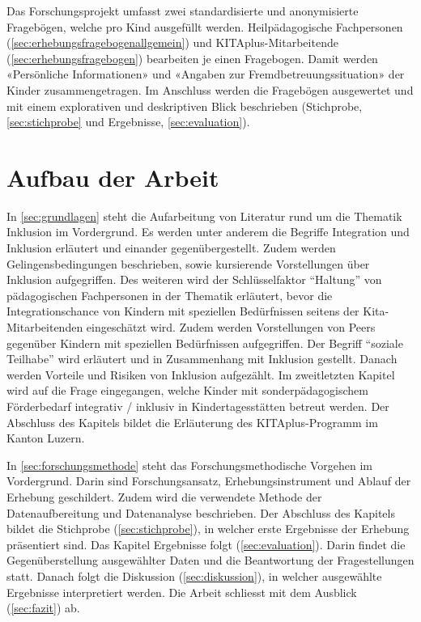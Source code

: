 \documentclass[
  ngerman,
  11pt,
  paper=a4,
  twoside,
  titlepage=true,
  openright,
  abstract=on,
  toc=listofnumbered,
  numbers=noenddot,
  chapterprefix=true,
  headings=optiontohead,
  svgnames,
  dvipsnames]{scrreprt}
\begin{document}
Das Forschungsprojekt umfasst zwei standardisierte und anonymisierte
Fragebögen, welche pro Kind ausgefüllt werden. Heilpädagogische
Fachpersonen (\cref{sec:erhebungsfragebogenallgemein}) und
KITAplus-Mitarbeitende (\cref{sec:erhebungsfragebogen}) bearbeiten je
einen Fragebogen. Damit werden «Persönliche Informationen» und «Angaben
zur Fremdbetreuungssituation» der Kinder zusammengetragen. Im Anschluss
werden die Fragebögen ausgewertet und mit einem explorativen und
deskriptiven Blick beschrieben (Stichprobe, \cref{sec:stichprobe} und
Ergebnisse, \cref{sec:evaluation}).

\hypertarget{sec:aufbau}{%
\section{Aufbau der Arbeit}\label{sec:aufbau}}

In \cref{sec:grundlagen} steht die Aufarbeitung von Literatur rund um
die Thematik Inklusion im Vordergrund. Es werden unter anderem die
Begriffe Integration und Inklusion erläutert und einander
gegenübergestellt. Zudem werden Gelingensbedingungen beschrieben, sowie
kursierende Vorstellungen über Inklusion aufgegriffen. Des weiteren wird
der Schlüsselfaktor “Haltung” von pädagogischen Fachpersonen in der
Thematik erläutert, bevor die Integrationschance von Kindern mit
speziellen Bedürfnissen seitens der Kita-Mitarbeitenden eingeschätzt
wird. Zudem werden Vorstellungen von Peers gegenüber Kindern mit
speziellen Bedürfnissen aufgegriffen. Der Begriff “soziale Teilhabe”
wird erläutert und in Zusammenhang mit Inklusion gestellt. Danach werden
Vorteile und Risiken von Inklusion aufgezählt. Im zweitletzten Kapitel
wird auf die Frage eingegangen, welche Kinder mit sonderpädagogischem
Förderbedarf integrativ / inklusiv in Kindertagesstätten betreut werden.
Der Abschluss des Kapitels bildet die Erläuterung des KITAplus-Programm
im Kanton Luzern.

In \cref{sec:forschungsmethode} steht das Forschungsmethodische Vorgehen
im Vordergrund. Darin sind Forschungsansatz, Erhebungsinstrument und
Ablauf der Erhebung geschildert. Zudem wird die verwendete Methode der
Datenaufbereitung und Datenanalyse beschrieben. Der Abschluss des
Kapitels bildet die Stichprobe (\cref{sec:stichprobe}), in welcher erste
Ergebnisse der Erhebung präsentiert sind. Das Kapitel Ergebnisse folgt
(\cref{sec:evaluation}). Darin findet die Gegenüberstellung ausgewählter
Daten und die Beantwortung der Fragestellungen statt. Danach folgt die
Diskussion (\cref{sec:diskussion}), in welcher ausgewählte Ergebnisse
interpretiert werden. Die Arbeit schliesst mit dem Ausblick
(\cref{sec:fazit}) ab.
\end{document}
